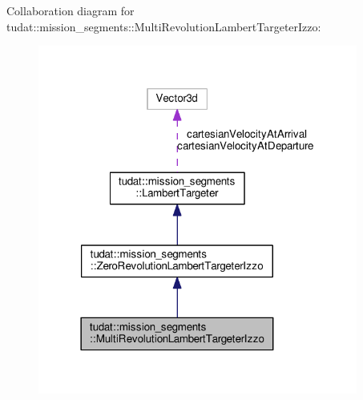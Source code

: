 Collaboration diagram for tudat\+:\+:mission\+\_\+segments\+:\+:Multi\+Revolution\+Lambert\+Targeter\+Izzo\+:
\nopagebreak
\begin{figure}[H]
\begin{center}
\leavevmode
\includegraphics[width=298pt]{classtudat_1_1mission__segments_1_1MultiRevolutionLambertTargeterIzzo__coll__graph}
\end{center}
\end{figure}
